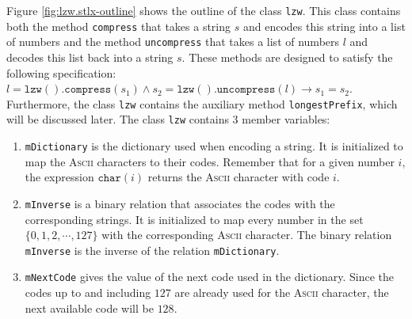 Figure \ref{fig:lzw.stlx-outline} shows the outline of the class \texttt{lzw}.  This class contains both the
method \texttt{compress} that takes a string $s$ and encodes this string into a list of numbers
and the method \texttt{uncompress} that takes a list of numbers $l$ and decodes this list back into
a string $s$.  These methods are designed to satisfy the following specification:
\\[0.2cm]
\hspace*{1.3cm}
$l = \mathtt{lzw().compress}(s_1) \wedge s_2 = \mathtt{lzw().uncompress}(l) \rightarrow s_1 = s_2$.
\\[0.2cm]
Furthermore, the class \texttt{lzw} contains the auxiliary method \texttt{longestPrefix}, which will
be discussed later.  The class \texttt{lzw} contains 3 member variables:
\begin{enumerate}
\item \texttt{mDictionary} is the dictionary used when encoding a string.  It is initialized to map
      the \textsc{Ascii} characters to their codes.  Remember that for a given number $i$, the
      expression $\mathtt{char}(i)$ returns the \textsc{Ascii} character with code $i$.
\item \texttt{mInverse} is a binary relation that associates the codes with the corresponding
      strings.  It is initialized to map every number in the set $\{ 0, 1, 2, \cdots, 127 \}$
      with the corresponding \textsc{Ascii} character.  The binary relation \texttt{mInverse} is the
      inverse of the relation \texttt{mDictionary}.
\item \texttt{mNextCode} gives the value of the next code used in the dictionary.  Since the codes
      up to and including $127$ are already used for the \textsc{Ascii} character, the next
      available code will be $128$.
\end{enumerate}


